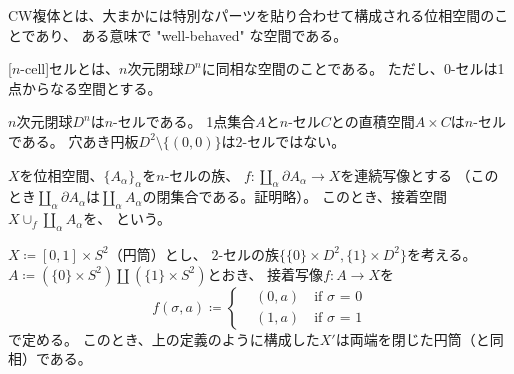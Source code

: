 \documentclass[report]{jlreq}
\begin{document}
CW複体とは、大まかには特別なパーツを貼り合わせて構成される位相空間のことであり、
ある意味で "well-behaved" な空間である。

\begin{definition}[$n$-セル]
    [$n$-cell]{セル}とは、$n$次元閉球$D^n$に同相な空間のことである。
    ただし、$0$-セルは1点からなる空間とする。
\end{definition}

\begin{example}[$n$-セルの例]
    $n$次元閉球$D^n$は$n$-セルである。
    1点集合$A$と$n$-セル$C$との直積空間$A \times C$は$n$-セルである。
    穴あき円板$D^2 \setminus \{(0, 0)\}$は$2$-セルではない。
\end{example}

\begin{definition}[$n$-セルを接着した空間]
    $X$を位相空間、$\{A_\alpha\}_\alpha$を$n$-セルの族、
    $f \colon \coprod_\alpha \partial A_\alpha \to X$を連続写像とする
    （このとき$\coprod_\alpha \partial A_\alpha$は$\coprod_\alpha A_\alpha$の閉集合である。証明略）。
    このとき、接着空間$X \cup_f \coprod_\alpha A_\alpha$を、
    という。
\end{definition}

\begin{example}[$n$-セルを接着した空間の例]
    $X \coloneqq [0, 1] \times S^2$（円筒）とし、
    $2$-セルの族$\{\{0\} \times D^2, \{1\} \times D^2\}$を考える。
    $A \coloneqq (\{0\} \times S^2) \amalg (\{1\} \times S^2)$とおき、
    接着写像$f \colon A \to X$を
    \begin{equation}
        f(\sigma, a) \coloneqq \begin{cases}
            &(0, a) \quad \text{if $\sigma$ = 0} \\
            &(1, a) \quad \text{if $\sigma$ = 1}
        \end{cases}
    \end{equation}
    で定める。
    このとき、上の定義のように構成した$X'$は両端を閉じた円筒（と同相）である。
\end{example}
\end{document}
